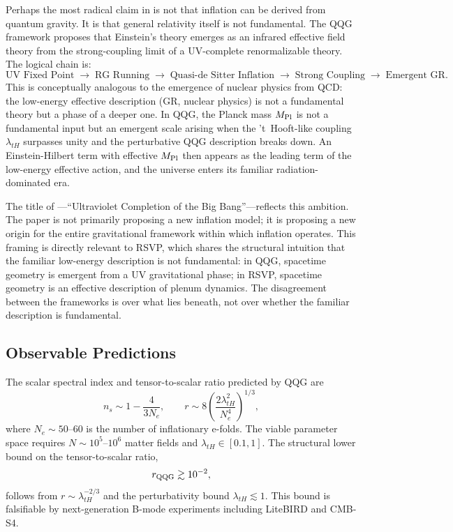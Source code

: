 \documentclass[12pt, a4paper]{article}
\newcommand{\rQQG}{r_{\rm QQG}}
\begin{document}
Perhaps the most radical claim in \citet{Liu2026} is not that inflation can be
derived from quantum gravity. It is that general relativity itself is not
fundamental. The QQG framework proposes that Einstein's theory emerges as an
infrared effective field theory from the strong-coupling limit of a UV-complete
renormalizable theory. The logical chain is:
\begin{equation}
\text{UV Fixed Point} \;\rightarrow\; \text{RG Running} \;\rightarrow\;
\text{Quasi-de Sitter Inflation} \;\rightarrow\; \text{Strong Coupling} \;\rightarrow\;
\text{Emergent GR}.
\end{equation}
This is conceptually analogous to the emergence of nuclear physics from QCD: the
low-energy effective description (GR, nuclear physics) is not a fundamental theory
but a phase of a deeper one. In QQG, the Planck mass $M_{\rm Pl}$ is not a
fundamental input but an emergent scale arising when the 't~Hooft-like coupling
$\lambda_{tH}$ surpasses unity and the perturbative QQG description breaks down.
An Einstein-Hilbert term with effective $M_{\rm Pl}$ then appears as the leading
term of the low-energy effective action, and the universe enters its familiar
radiation-dominated era.

The title of \citet{Liu2026}---``Ultraviolet Completion of the Big Bang''---reflects
this ambition. The paper is not primarily proposing a new inflation model; it is
proposing a new origin for the entire gravitational framework within which inflation
operates. This framing is directly relevant to RSVP, which shares the structural
intuition that the familiar low-energy description is not fundamental: in QQG,
spacetime geometry is emergent from a UV gravitational phase; in RSVP, spacetime
geometry is an effective description of plenum dynamics. The disagreement between
the frameworks is over what lies beneath, not over whether the familiar description
is fundamental.

\subsection{Observable Predictions}

The scalar spectral index and tensor-to-scalar ratio predicted by QQG are
\begin{equation}
n_s \sim 1 - \frac{4}{3N_e}, \qquad r \sim 8\left(\frac{2\lambda_{tH}^2}{N_e^4}\right)^{1/3},
\end{equation}
where $N_e \sim 50$--$60$ is the number of inflationary e-folds. The viable
parameter space requires $N \sim 10^5$--$10^6$ matter fields and
$\lambda_{tH} \in [0.1, 1]$. The structural lower bound on the tensor-to-scalar
ratio,
\begin{equation}
\rQQG \gtrsim 10^{-2},
\label{eq:qqg_floor}
\end{equation}
follows from $r \sim \lambda_{tH}^{-2/3}$ and the perturbativity bound
$\lambda_{tH} \lesssim 1$. This bound is falsifiable by next-generation B-mode
experiments including LiteBIRD and CMB-S4.
\end{document}
